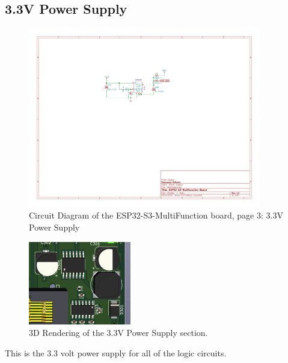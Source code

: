 \subsection{3.3V Power Supply}
\begin{figure}[hbpt]\begin{centering}%
\includegraphics[width=4in]{ESP32-S3-MultiFunction-3.pdf}
\caption{Circuit Diagram of the ESP32-S3-MultiFunction board, page 3: 3.3V 
Power Supply}
\end{centering}\end{figure}
\begin{figure}[hbpt]\begin{centering}%
\includegraphics{ESP32-S3-MultiFunction-top3D-PowerSupply.png}
\caption{3D Rendering of the 3.3V Power Supply section.}
\end{centering}\end{figure}

This is the 3.3 volt power supply for all of the logic circuits.

